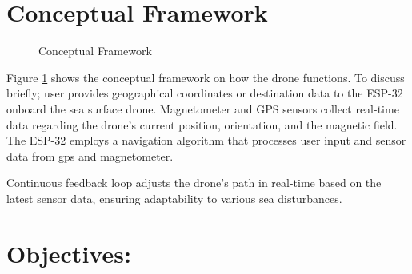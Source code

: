 \section{Conceptual Framework}
\begin{figure}[ht]
\begin{center}
\end{center}

\caption{Conceptual Framework}
\label{fig:ConceptualFramework}
\end{figure}

Figure \ref{fig:ConceptualFramework} shows the conceptual framework on how the drone functions. To discuss briefly; user provides geographical
coordinates or destination data to the ESP-32 onboard the sea surface drone. Magnetometer and GPS sensors collect real-time data regarding the 
drone's current position, orientation, and the magnetic field. The ESP-32 employs a navigation algorithm that processes user input and sensor 
data from gps and magnetometer.

Continuous feedback loop adjusts the drone's path in real-time based on the latest sensor data, ensuring adaptability to various sea disturbances.

\section{\bf \centering Objectives:}

